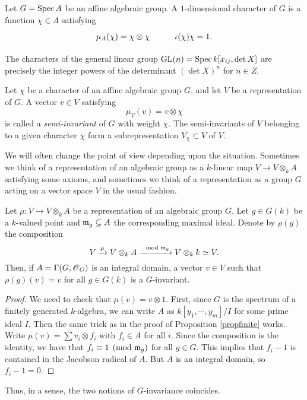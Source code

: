 \documentclass[11pt, english]{article}
\begin{document}
\begin{defi}
Let $G=\operatorname{Spec} A$ be an affine algebraic group. A $1$-dimensional character of $G$ is a function $\chi \in A$ satisfying
\[
\xymatrix{
\mu_A(\chi) = \chi \otimes \chi & \iota(\chi)\chi = 1.
}
\]
\end{defi}

\begin{lemma}
\label{chargl}
The characters of the general linear group $\operatorname{GL}(n) = \operatorname{Spec} k[x_{ij}, \det X]$ are precisely the integer powers of the determinant $(\det X)^n$ for $n \in Z$.   
\end{lemma}

\begin{defi}
  Let $\chi$ be a character of an affine algebraic group $G$, and let $V$ be a representation of $G$. A vector $v \in V$ satisfying $$\mu_V(v) = v \otimes \chi$$ is called a \emph{semi-invariant} of $G$ with weight $\chi$. The semi-invariants of $V$ belonging to a given character $\chi$ form a subrepresentation $V_\chi \subset V$ of $V$.
\end{defi}

We will often change the point of view depending upon the situation. Sometimes we think of a representation of an algebraic group as a $k$-linear map $V \to V \otimes_k A$ satisfying some axioms, and sometimes we think of a representation as a group $G$ acting on a vector space $V$ in the usual fashion.

\begin{prop}
 Let $\mu: V \to V \otimes_k A$ be a representation of an algebraic group $G$. Let $g \in G(k)$ be a $k$-valued point and $\mathfrak{m}_g \subseteq A$ the corresponding maximal ideal. Denote by $\rho(g)$ the composition
\[
V \xrightarrow{\mu} V \otimes_k A \xrightarrow {\mod {\mathfrak{m}}_g} V \otimes_k k \simeq V.
\]
Then, if $A=\Gamma(G,\operatorname{\mathscr{O}}_G)$ is an integral domain, a vector $v \in V$ such that $\rho(g)(v)=v$ for all $g \in G(k)$ is a $G$-invariant.
\end{prop}
\begin{proof}
We need to check that $\mu(v)=v \otimes 1$.  First, since $G$ is the spectrum of a finitely generated $k$-algebra, we can write $A$ as $k[y_1,\cdots,y_m]/I$ for some prime ideal $I$. Then the same trick as in the proof of Proposition \ref{propfinite} works. Write $\mu(v)=\sum v_i \otimes f_i$ with $f_i \in A$ for all $i$. Since the composition is the identity, we have that $f_i \equiv 1 \pmod{\mathfrak{m}_g}$ for all $g \in G$. This implies that $f_i-1$ is contained in the Jacobson radical of $A$. But $A$ is an integral domain, so $f_i-1=0$.
\end{proof}
Thus, in a sense, the two notions of $G$-invariance coincides.
\end{document}

